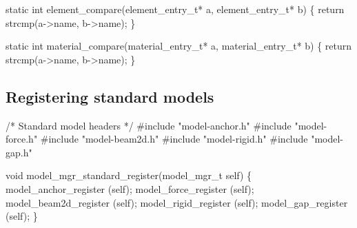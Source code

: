 \nwenddocs{}\plusendmoddef
static int element_compare(element_entry_t* a, element_entry_t* b)
\{
    return strcmp(a->name, b->name);
\}

static int material_compare(material_entry_t* a, material_entry_t* b)
\{
    return strcmp(a->name, b->name);
\}

\nwendcode{}\nwdocspar

\subsection{Registering standard models}

\nwenddocs{}\endmoddef
/* Standard model headers */
#include "model-anchor.h"
#include "model-force.h"
#include "model-beam2d.h"
#include "model-rigid.h"
#include "model-gap.h"

\nwendcode{}\nwdocspar

\nwenddocs{}\plusendmoddef
void model_mgr_standard_register(model_mgr_t self)
\{
    model_anchor_register (self);
    model_force_register  (self);
    model_beam2d_register (self);
    model_rigid_register  (self);
    model_gap_register    (self);
\}

\nwendcode{}

